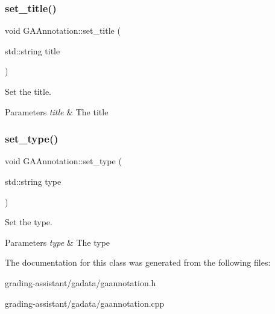 \subsubsection{\texorpdfstring{set\+\_\+title()}{set\_title()}}
{\footnotesize\ttfamily void G\+A\+Annotation\+::set\+\_\+title (\begin{DoxyParamCaption}\item[{std\+::string}]{title }\end{DoxyParamCaption})}



Set the title. 


\begin{DoxyParams}{Parameters}
{\em title} & The title \\
\hline
\end{DoxyParams}
\mbox{\label{class_g_a_annotation_a89552ebe856f6a6c0844e9d67237df45}} 
\subsubsection{\texorpdfstring{set\+\_\+type()}{set\_type()}}
{\footnotesize\ttfamily void G\+A\+Annotation\+::set\+\_\+type (\begin{DoxyParamCaption}\item[{std\+::string}]{type }\end{DoxyParamCaption})}



Set the type. 


\begin{DoxyParams}{Parameters}
{\em type} & The type \\
\hline
\end{DoxyParams}


The documentation for this class was generated from the following files\+:\begin{DoxyCompactItemize}
\item 
grading-\/assistant/gadata/gaannotation.\+h\item 
grading-\/assistant/gadata/gaannotation.\+cpp\end{DoxyCompactItemize}
